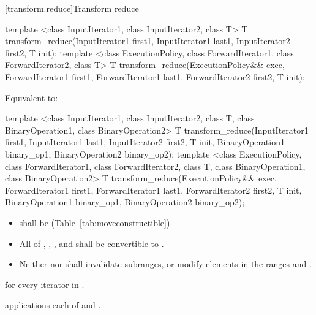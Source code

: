 [transform.reduce]{Transform reduce}
%
\begin{itemdecl}
template <class InputIterator1, class InputIterator2, class T>
  T transform_reduce(InputIterator1 first1, InputIterator1 last1,
                     InputIterator2 first2,
                     T init);
template <class ExecutionPolicy,
          class ForwardIterator1, class ForwardIterator2, class T>
  T transform_reduce(ExecutionPolicy&& exec,
                     ForwardIterator1 first1, ForwardIterator1 last1,
                     ForwardIterator2 first2,
                     T init);
\end{itemdecl}

\begin{itemdescr}
\pnum
\effects Equivalent to:
\end{itemdescr}

%
\begin{itemdecl}
template <class InputIterator1, class InputIterator2, class T,
          class BinaryOperation1, class BinaryOperation2>
  T transform_reduce(InputIterator1 first1, InputIterator1 last1,
                     InputIterator2 first2,
                     T init,
                     BinaryOperation1 binary_op1,
                     BinaryOperation2 binary_op2);
template <class ExecutionPolicy,
          class ForwardIterator1, class ForwardIterator2, class T,
          class BinaryOperation1, class BinaryOperation2>
  T transform_reduce(ExecutionPolicy&& exec, 
                     ForwardIterator1 first1, ForwardIterator1 last1,
                     ForwardIterator2 first2,
                     T init,
                     BinaryOperation1 binary_op1,
                     BinaryOperation2 binary_op2);
\end{itemdecl}

\begin{itemdescr}
\pnum
\requires
\begin{itemize}
\item {} shall be  (Table~\ref{tab:moveconstructible}).
\item All of ,
,
, and
shall be convertible to .
\item Neither  nor  shall invalidate
subranges, or modify elements in the ranges  and
.
\end{itemize}

\pnum
\returns {}
for every iterator  in .

\pnum
\complexity {} applications each of  and
.
\end{itemdescr}

